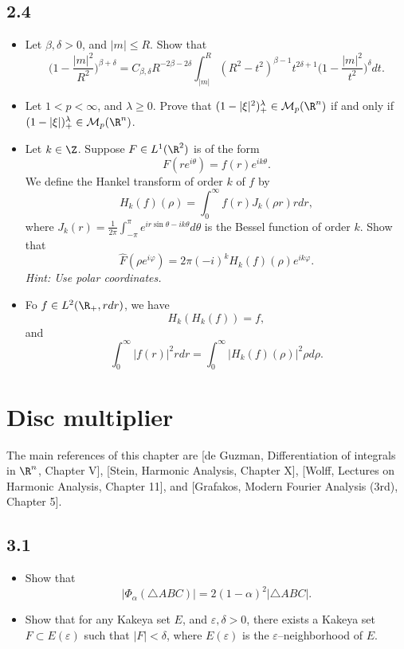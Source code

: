 \subsection*{2.4}
\begin{itemize}
    \item[1.]Let $\beta,\delta>0$, and $|m|\le R$. Show that
    $$\big({\textstyle 1-\frac{|m|^2}{R^2}}\big)^{\beta+\delta}
    =C_{\beta,\delta}R^{-2\beta-2\delta}\int_{|m|}^R
    (R^2-t^2)^{\beta-1}t^{2\delta+1}\big({\textstyle 1-\frac{|m|^2}{t^2}}\big)^\delta dt.$$

    \item[2.]Let $1<p<\infty$, and $\lambda\ge0$. 
    Prove that $(1-|\xi|^2)^\lambda_+\in\mathcal{M}_p(\R^n)$ if and only if 
    $(1-|\xi|)^\lambda_+\in\mathcal{M}_p(\R^n)$.

    \item[3.]Let $k\in\Z$. Suppose $F\in L^1(\R^2)$ is of the form
    $$F(re^{i\theta})=f(r)e^{ik\theta}.$$
    We define the Hankel transform of order $k$ of $f$ by
    $$H_k(f)(\rho)=\int_0^\infty f(r)J_k(\rho r)rdr,$$
    where $J_k(r)=\frac{1}{2\pi}\int_{-\pi}^\pi e^{ir\sin\theta-ik\theta}d\theta$ 
    is the Bessel function of order $k$. Show that
    $$\widehat{F}(\rho e^{i\varphi})=2\pi(-i)^kH_k(f)(\rho)e^{ik\varphi}.$$
    \textit{Hint: Use polar coordinates.}
    
    \item[4.]Fo $f\in L^2(\R_+,rdr)$, we have
    $$H_k(H_k(f))=f,$$
    and
    $$\int_0^\infty|f(r)|^2rdr=\int_0^\infty|H_k(f)(\rho)|^2\rho d\rho.$$
\end{itemize}
\section{Disc multiplier}
The main references of this chapter are [de Guzman, Differentiation of integrals
in $\R^n$, Chapter V], [Stein, Harmonic Analysis, Chapter X], [Wolff, Lectures on
Harmonic Analysis, Chapter 11], and [Grafakos, Modern Fourier Analysis (3rd),
Chapter 5].

\subsection*{3.1}
\begin{itemize}
    \item[1.]Show that $$|\Phi_\alpha(\triangle ABC)|=2(1-\alpha)^2|\triangle ABC|.$$

    \item[2.]Show that for any Kakeya set $E$, and $\varepsilon,\delta>0$, 
    there exists a Kakeya set $F\subset E(\varepsilon)$ such that $|F|<\delta$, 
    where $E(\varepsilon)$ is the $\varepsilon$--neighborhood of $E$.

\end{itemize}
